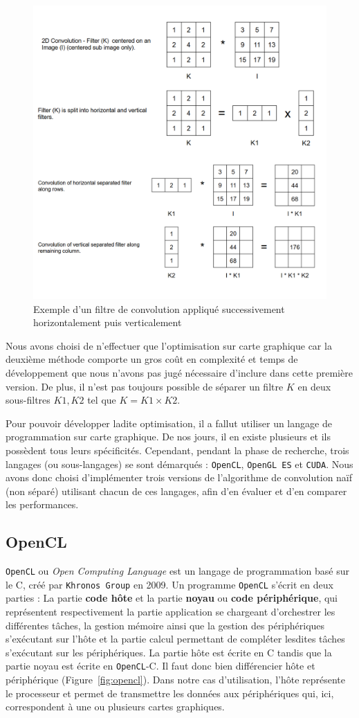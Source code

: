 \begin{figure}[H]
\centering
\includegraphics[width=0.7\linewidth]{images/separableconv}
\caption{Exemple d'un filtre de convolution appliqué successivement horizontalement puis verticalement}
\label{fig:conv:separable}
\end{figure}

Nous avons choisi de n'effectuer que l'optimisation sur carte graphique car la deuxième méthode comporte un gros coût en complexité et temps de développement que nous n'avons pas jugé nécessaire d'inclure dans cette première version. De plus, il n'est pas toujours possible de séparer un filtre $K$ en deux sous-filtres $K1, K2$ tel que $K = K1 \times K2$.

Pour pouvoir développer ladite optimisation, il a fallut utiliser un langage de programmation sur carte graphique. De nos jours, il en existe plusieurs et ils possèdent tous leurs spécificités. Cependant, pendant la phase de recherche, trois langages (ou sous-langages) se sont démarqués : \texttt{OpenCL}\cite{opencl}, \texttt{OpenGL ES}\cite{opengles} et \texttt{CUDA}\cite{cuda}. Nous avons donc choisi d'implémenter trois versions de l'algorithme de convolution naïf (non séparé) utilisant chacun de ces langages, afin d'en évaluer et d'en comparer les performances.

\subsection{OpenCL} 
\texttt{OpenCL} ou \emph{Open Computing Language} est un langage de programmation basé sur le C, créé par \texttt{Khronos Group} en 2009.
Un programme \texttt{OpenCL} s'écrit en deux parties : La partie \textbf{code hôte} et la partie \textbf{noyau} ou \textbf{code périphérique}, qui représentent respectivement la partie application se chargeant d'orchestrer les différentes tâches, la gestion mémoire ainsi que la gestion des périphériques s'exécutant sur l'hôte et la partie calcul permettant de compléter lesdites tâches s'exécutant sur les périphériques. La partie hôte est écrite en C tandis que la partie noyau est écrite en \texttt{OpenCL}-C.
Il faut donc bien différencier hôte et périphérique (Figure~\ref{fig:opencl}). Dans notre cas d'utilisation, l'hôte représente le processeur et permet de transmettre les données aux périphériques qui, ici, correspondent à une ou plusieurs cartes graphiques.

